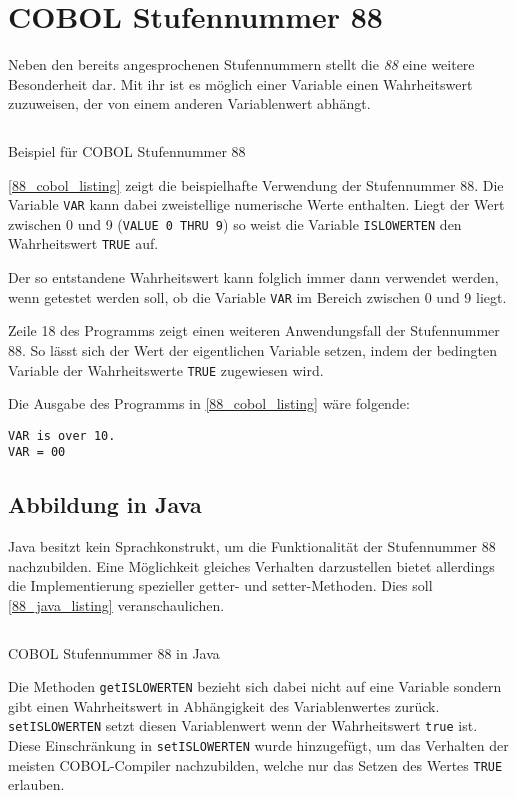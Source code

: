\section{COBOL Stufennummer 88}
Neben den bereits angesprochenen Stufennummern stellt die \textit{88} eine weitere Besonderheit dar. Mit ihr ist es möglich einer Variable einen Wahrheitswert zuzuweisen, der von einem anderen Variablenwert abhängt. 

\begin{listing}[H]
  \inputminted[bgcolor=hellgrau,xleftmargin=20pt,linenos,fontsize=\footnotesize]{cobol}{Code/88_section.cbl.txt}
  \caption{Beispiel für COBOL Stufennummer 88}
  \label{88_cobol_listing}
\end{listing} 

\autoref{88_cobol_listing} zeigt die beispielhafte Verwendung der Stufennummer 88. Die Variable \texttt{VAR} kann dabei zweistellige numerische Werte enthalten. Liegt der Wert zwischen 0 und 9 (\texttt{VALUE 0 THRU 9}) so weist die Variable \texttt{ISLOWERTEN} den Wahrheitswert \texttt{TRUE} auf.

Der so entstandene Wahrheitswert kann folglich immer dann verwendet werden, wenn getestet werden soll, ob die Variable \texttt{VAR} im Bereich zwischen 0 und 9 liegt.

Zeile 18 des Programms zeigt einen weiteren Anwendungsfall der Stufennummer 88. So lässt sich der Wert der eigentlichen Variable setzen, indem der bedingten Variable der Wahrheitswerte \texttt{TRUE} zugewiesen wird.

Die Ausgabe des Programms in \autoref{88_cobol_listing} wäre folgende:
\begin{verbatim}
VAR is over 10.
VAR = 00
\end{verbatim}

\subsection*{Abbildung in Java}
Java besitzt kein Sprachkonstrukt, um die Funktionalität der Stufennummer 88 nachzubilden. Eine Möglichkeit gleiches Verhalten darzustellen bietet allerdings die Implementierung spezieller getter- und setter-Methoden. Dies soll \autoref{88_java_listing} veranschaulichen.

\begin{listing}[H]
  \inputminted[bgcolor=hellgrau,xleftmargin=20pt,linenos,fontsize=\footnotesize]{java}{Code/88_section.java.txt}
  \caption{COBOL Stufennummer 88 in Java}
  \label{88_java_listing}
\end{listing} 

Die Methoden \texttt{getISLOWERTEN} bezieht sich dabei nicht auf eine Variable sondern gibt einen Wahrheitswert in Abhängigkeit des Variablenwertes zurück. \texttt{setISLOWERTEN} setzt diesen Variablenwert wenn der Wahrheitswert \texttt{true} ist. Diese Einschränkung in \texttt{setISLOWERTEN} wurde hinzugefügt, um das Verhalten der meisten COBOL-Compiler nachzubilden, welche nur das Setzen des Wertes \texttt{TRUE} erlauben.